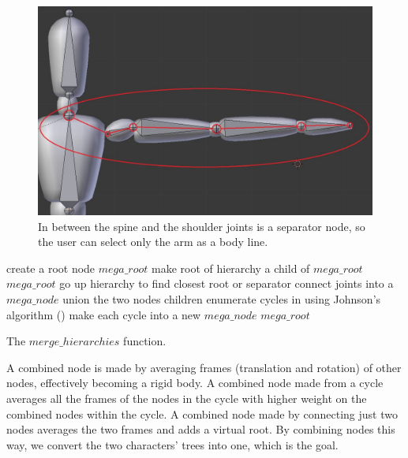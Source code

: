 \begin{figure}[H]
\centering
\includegraphics[scale=0.3]{img/shoulder}
\caption{In between the spine and the shoulder joints is a separator node, so the user can select only the arm as a body line.}
\end{figure}

\begin{algorithm}[H]
 {
  create a root node $mega\_root$\;
  {
   make root of hierarchy a child of $mega\_root$\;
   \Return $mega\_root$\;
  }
 }
 {
  {
   go up hierarchy to find closest root or separator\;
   {
    connect joints into a $mega\_node$\;
    union the two nodes children\;
   }
  }
 }
 enumerate cycles in using Johnson's algorithm (\citep{johnson1975finding})\;
 make each cycle into a new $mega\_node$\;
 \Return $mega\_root$\;
 
 \caption{The $merge\_hierarchies$ function.}
\end{algorithm}

A combined node is made by averaging frames (translation and rotation) of other nodes, effectively becoming a rigid body. A combined node made from a cycle averages all the frames of the nodes in the cycle with higher weight on the combined nodes within the cycle. A combined node made by connecting just two nodes averages the two frames and adds a virtual root. By combining nodes this way, we convert the two characters' trees into one, which is the goal.

